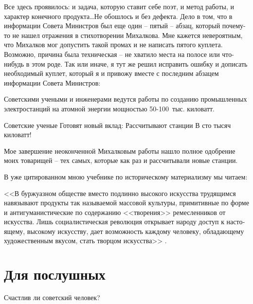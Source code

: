 \documentclass{book}
\begin{document}
Все здесь проявилось: и задача, которую ставит себе поэт, и метод работы, и характер конечного продукта\ldots Не обошлось и без 
дефекта. Дело в том, что в информации Совета Министров был еще один -- пятый -- абзац, который почему-то не нашел отражения в 
стихотворении Михалкова. Мне кажется невероятным, что Михалков мог допустить такой промах и не написать пятого куплета. 
Возможно, причина была техническая -- не хватило места на полосе или что-нибудь в этом роде. Так или иначе, я тут же решил 
исправить ошибку и дописать необходимый куплет, который я и привожу вместе с последним абзацем информации Совета Министров:

\begin{minipage}{0.4\textwidth}
Советскими учеными и инженерами ведутся работы по созданию промышленных электростанций на атомной энергии мощностью 50-100~тыс. киловатт.
\end{minipage}
\hfill
\begin{minipage}{0.4\textwidth}
Советские ученые
Готовят новый вклад:
Рассчитывают станции
В сто тысяч киловатт!
\end{minipage}

\vspace*{1em}

Мое завершение неоконченной Михалковым работы нашло полное одобрение моих товарищей -- тех самых, которые как раз и рассчитывали 
новые станции.

В уже цитированном мною учебнике по историческому материализму мы читаем:

<<В буржуазном обществе вместо подлинно высокого искусства трудящимся навязывают продукты так называемой массовой культуры, 
примитивные по форме и антигуманистические по содержанию <<творения>> ремесленников от искусства. Лишь социалистическая революция 
открывает народу доступ к насто­ящему, высокому искусству, дает возможность каждому чело­веку, обладающему художественным вкусом, 
стать творцом искусства>>%
.


\section{Для послушных}

Счастлив ли советский человек?
\end{document}
